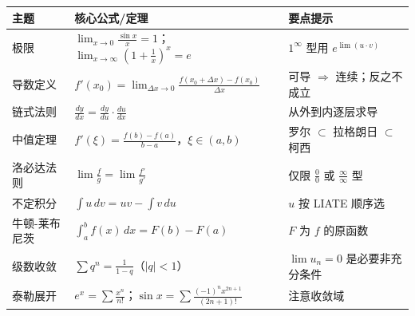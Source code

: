 \documentclass[12pt,a4paper]{article}
\begin{document}
\begin{tcolorbox}[enhanced, colback=PaperWhite, colframe=DeepBlue, boxrule=1.5pt, arc=5pt, title={\sffamily\bfseries\large 高数核心公式与结论速查}, coltitle=white, attach boxed title to top center={yshift=-10pt}, boxed title style={colback=DeepBlue, rounded corners}]
\vspace{0.5em}

{\renewcommand{\arraystretch}{1.6}
\begin{tabular}{|p{3.5cm}|p{5cm}|p{6cm}|}
\hline
\rowcolor{MainRed!20}
\textbf{主题} & \textbf{核心公式/定理} & \textbf{要点提示} \\
\hline
\rowcolor{MintGreen!10}
极限 & $\displaystyle\lim_{x\to 0}\frac{\sin x}{x}=1$；$\displaystyle\lim_{x\to\infty}\left(1+\frac{1}{x}\right)^x=e$ & $1^\infty$ 型用 $e^{\lim(u\cdot v)}$ \\
\hline
\rowcolor{Sunshine!10}
导数定义 & $f'(x_0)=\displaystyle\lim_{\Delta x\to 0}\frac{f(x_0+\Delta x)-f(x_0)}{\Delta x}$ & 可导 $\Rightarrow$ 连续；反之不成立 \\
\hline
\rowcolor{Royal!10}
链式法则 & $\frac{dy}{dx}=\frac{dy}{du}\cdot\frac{du}{dx}$ & 从外到内逐层求导 \\
\hline
\rowcolor{Coral!10}
中值定理 & $f'(\xi)=\frac{f(b)-f(a)}{b-a}$，$\xi\in(a,b)$ & 罗尔 $\subset$ 拉格朗日 $\subset$ 柯西 \\
\hline
\rowcolor{Lime!15}
洛必达法则 & $\displaystyle\lim\frac{f}{g}=\lim\frac{f'}{g'}$ & 仅限 $\frac{0}{0}$ 或 $\frac{\infty}{\infty}$ 型 \\
\hline
\rowcolor{Pink!10}
不定积分 & $\int u\,dv = uv - \int v\,du$ & $u$ 按 LIATE 顺序选 \\
\hline
\rowcolor{Gold!15}
牛顿-莱布尼茨 & $\displaystyle\int_a^b f(x)\,dx = F(b)-F(a)$ & $F$ 为 $f$ 的原函数 \\
\hline
\rowcolor{Teal!10}
级数收敛 & $\sum q^n = \frac{1}{1-q}$（$|q|<1$） & $\lim u_n=0$ 是必要非充分条件 \\
\hline
\rowcolor{Lavender!10}
泰勒展开 & $e^x=\sum\frac{x^n}{n!}$；$\sin x = \sum\frac{(-1)^n x^{2n+1}}{(2n+1)!}$ & 注意收敛域 \\
\hline
\end{tabular}}
\end{tcolorbox}

\vspace{1em}
\end{document}
